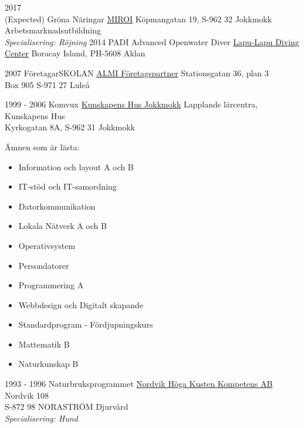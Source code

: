 \documentclass[a4paper]{twentysecondcv} %
\begin{document}
\begin{twenty}
	\twentyitem
    	{2017 \\ (Expected)}
        {Gröna Näringar}
        {\href{https://miroi.se/ort/jokkmokk//}{MIROI}}
        {Köpmangatan 19, S-962 32 Jokkmokk}
        {Arbetsmarknadsutbildning \\ \textit{Specialisering: Röjning}}
	\twentyitem
    	{2014}
        {PADI Advanced Openwater Diver}
        {\href{http://www.lapulapu.com/}{Lapu-Lapu Diving Center}}
        {Boracay Island, PH-5608 Aklan}
		{}

	\twentyitem
    	{2007}
        {FöretagarSKOLAN}
        {\href{http://www.almi.se}{ALMI Företagspartner}}
        {Stationsgatan 36, plan 3 \\ Box 905 S-971 27 Luleå}
        {}

	\twentyitem
    	{1999 - 2006}
        {Komvux}
        {\href{http://www.lapplands.se/larcentra/jokkmokk}{Kunskapens Hus Jokkmokk}}
        {Lapplands lärcentra, Kunskapens Hus \\ Kyrkogatan 8A, S-962 31 Jokkmokk}
        {Ämnen som är lästa:
        	\begin{itemize}
            	\item Information och layout A och B
                \item IT-stöd och IT-samordning
                \item Datorkommunikation
                \item Lokala Nätverk A och B
                \item Operativsystem
                \item Persondatorer
                \item Programmering A
                \item Webbdesign och Digitalt skapande
                \item Standardprogram - Fördjupningskurs
                \item Mattematik B
                \item Naturkunskap B
        	\end{itemize}}
	\twentyitem
    	{1993 - 1996}
        {Naturbruksprogrammet}
        {\href{http://www.naturbruk.net/}{Nordvik Höga Kusten Kompetens AB}}
        {Nordvik 108 \\ S-872 98 NORASTRÖM}
        {Djurvård \\ \textit{Specialisering: Hund}}


\end{twenty}
\end{document}
